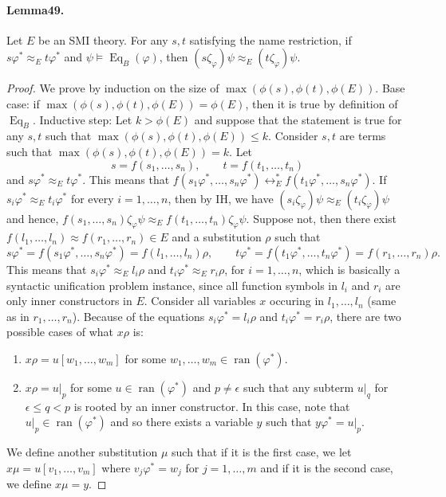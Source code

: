 \paragraph{Lemma49.} Let $E$ be an SMI theory. For any $s,t$ satisfying the name restriction, if $s\varphi^*\approx_Et\varphi^*$ and $\psi\models\operatorname{Eq}_B(\varphi)$, then $(s\zeta_\varphi)\psi\approx_E(t\zeta_\varphi)\psi$.
\begin{proof}
We prove by induction on the size of $\max(\phi(s),\phi(t),\phi(E))$.
Base case: if $\max(\phi(s),\phi(t),\phi(E))=\phi(E)$, then it is true by definition of $\operatorname{Eq}_B$.
Inductive step: Let $k>\phi(E)$ and suppose that the statement is true for any $s,t$ such that $\max(\phi(s),\phi(t),\phi(E))\le k$.
Consider $s,t$ are terms such that $\max(\phi(s),\phi(t),\phi(E))=k$. Let
\[
s=f(s_1,\ldots,s_n),\qquad t=f(t_1,\ldots,t_n)
\]
and $s\varphi^*\approx_Et\varphi^*$.
This means that $f(s_1\varphi^*,\ldots,s_n\varphi^*)\leftrightarrow_E^*f(t_1\varphi^*,\ldots,s_n\varphi^*)$.
If $s_i\varphi^*\approx_Et_i\varphi^*$ for every $i=1,\ldots,n$, then by IH, we have $(s_i\zeta_\varphi)\psi\approx_E(t_i\zeta_\varphi)\psi$ and hence, $f(s_1,\ldots,s_n)\zeta_\varphi\psi\approx_E f(t_1,\ldots,t_n)\zeta_\varphi\psi$.
Suppose not, then there exist $f(l_1,\ldots,l_n)\approx f(r_1,\ldots,r_n)\in E$ and a substitution $\rho$ such that
\[
s\varphi^*=f(s_1\varphi^*,\ldots,s_n\varphi^*)=f(l_1,\ldots,l_n)\rho,
\qquad t\varphi^*=f(t_1\varphi^*,\ldots,t_n\varphi^*)=f(r_1,\ldots,r_n)\rho.
\]
This means that $s_i\varphi^*\approx_El_i\rho$ and $t_i\varphi^*\approx_Er_i\rho$, for $i=1,\ldots,n$, which is basically a syntactic unification problem instance, since all function symbols in $l_i$ and $r_i$ are only inner constructors in $E$.
Consider all variables $x$ occuring in $l_1,\ldots,l_n$ (same as in $r_1,\ldots,r_n$). Because of the equations $s_i\varphi^*=l_i\rho$ and $t_i\varphi^*=r_i\rho$, there are two possible cases of what $x\rho$ is:
\begin{enumerate}
\item $x\rho=u[w_1,\ldots,w_m]$ for some $w_1,\ldots,w_m\in\operatorname{ran}(\varphi^*)$.
\item $x\rho=u|_p$ for some $u\in\operatorname{ran}(\varphi^*)$ and $p\ne\epsilon$ such that any subterm $u|_q$ for $\epsilon\le q<p$ is rooted by an inner constructor. In this case, note that $u|_p\in\operatorname{ran}(\varphi^*)$ and so there exists a variable $y$ such that $y\varphi^*=u|_p$.
\end{enumerate}
We define another substitution $\mu$ such that if it is the first case, we let $x\mu=u[v_1,\ldots,v_m]$ where $v_j\varphi^*=w_j$ for $j=1,\ldots,m$ and if it is the second case, we define $x\mu=y$.

\end{proof}
